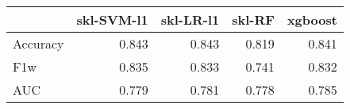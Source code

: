 \begin{tabular}{lrrrr}
\toprule
{} &  skl-SVM-l1 &  skl-LR-l1 &  skl-RF &  xgboost \\
\midrule
Accuracy &       0.843 &      0.843 &   0.819 &    0.841 \\
F1w      &       0.835 &      0.833 &   0.741 &    0.832 \\
AUC      &       0.779 &      0.781 &   0.778 &    0.785 \\
\bottomrule
\end{tabular}
